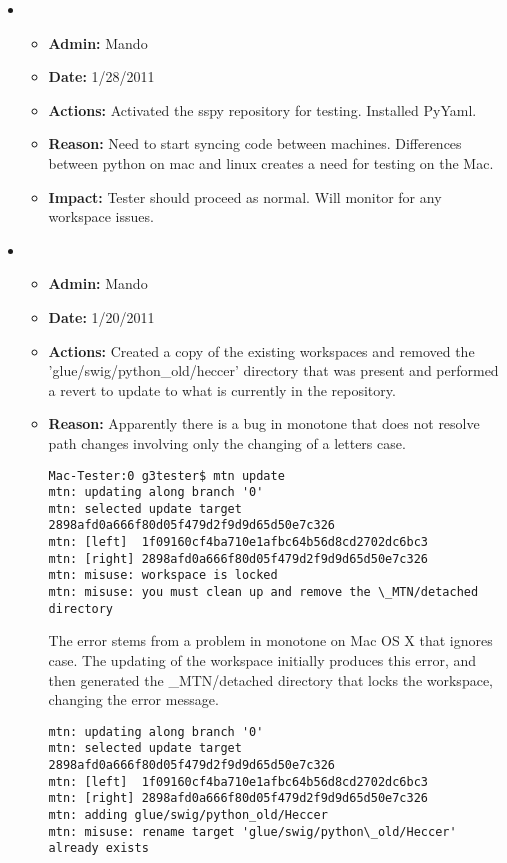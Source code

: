 \documentclass[12pt]{article}
\begin{document}
\begin{itemize}



\item
\begin{itemize}
\item[] {\bf Admin:} Mando
\item[] {\bf Date:} 1/28/2011 
\item[] {\bf Actions:}  Activated the sspy repository for testing. Installed PyYaml.
\item[] {\bf Reason:} Need to start syncing code between machines. Differences between python on mac and linux creates a need for testing on the Mac. 
\item[] {\bf Impact:}  Tester should proceed as normal. Will monitor for any workspace issues.
\end{itemize}

\item 
\begin{itemize}
\item[] {\bf Admin:} Mando
\item[] {\bf Date:} 1/20/2011
\item[] {\bf Actions:} Created a copy of the existing workspaces and removed the 'glue/swig/python\_old/heccer' directory that was present and performed a revert to update to what is currently in the repository.
\item[] {\bf Reason:}  Apparently there is a bug in monotone that does not resolve path changes involving only the changing of a letters case.

\begin{verbatim}
Mac-Tester:0 g3tester$ mtn update
mtn: updating along branch '0'
mtn: selected update target 2898afd0a666f80d05f479d2f9d9d65d50e7c326
mtn: [left]  1f09160cf4ba710e1afbc64b56d8cd2702dc6bc3
mtn: [right] 2898afd0a666f80d05f479d2f9d9d65d50e7c326
mtn: misuse: workspace is locked
mtn: misuse: you must clean up and remove the \_MTN/detached directory
\end{verbatim}

The error stems from a problem in monotone on Mac OS X that ignores case.  The updating of the workspace initially produces this error, and then generated the \_MTN/detached directory that locks the workspace, changing the error message.

\begin{verbatim}
mtn: updating along branch '0'
mtn: selected update target 2898afd0a666f80d05f479d2f9d9d65d50e7c326
mtn: [left]  1f09160cf4ba710e1afbc64b56d8cd2702dc6bc3
mtn: [right] 2898afd0a666f80d05f479d2f9d9d65d50e7c326
mtn: adding glue/swig/python_old/Heccer
mtn: misuse: rename target 'glue/swig/python\_old/Heccer' already exists
\end{verbatim}


\end{itemize}
\end{itemize}
\end{document}
